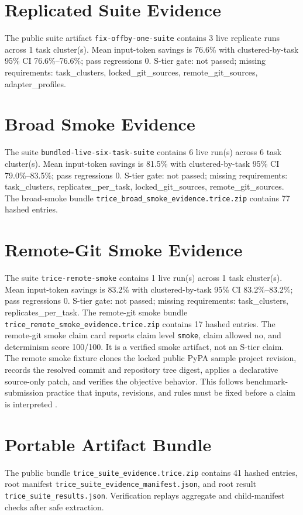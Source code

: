 \documentclass[10pt]{article}
\begin{document}
        \section{Replicated Suite Evidence}
        The public suite artifact \texttt{fix-offby-one-suite} contains 3 live replicate runs across 1 task cluster(s). Mean input-token savings is 76.6\% with clustered-by-task 95\% CI 76.6\%--76.6\%; pass regressions 0. S-tier gate: not passed; missing requirements: task\_clusters, locked\_git\_sources, remote\_git\_sources, adapter\_profiles.

        \section{Broad Smoke Evidence}
        The suite \texttt{bundled-live-six-task-suite} contains 6 live run(s) across 6 task cluster(s). Mean input-token savings is 81.5\% with clustered-by-task 95\% CI 79.0\%--83.5\%; pass regressions 0. S-tier gate: not passed; missing requirements: task\_clusters, replicates\_per\_task, locked\_git\_sources, remote\_git\_sources. The broad-smoke bundle \texttt{trice_broad_smoke_evidence.trice.zip} contains 77 hashed entries.

        \section{Remote-Git Smoke Evidence}
        The suite \texttt{trice-remote-smoke} contains 1 live run(s) across 1 task cluster(s). Mean input-token savings is 83.2\% with clustered-by-task 95\% CI 83.2\%--83.2\%; pass regressions 0. S-tier gate: not passed; missing requirements: task\_clusters, replicates\_per\_task. The remote-git smoke bundle \texttt{trice_remote_smoke_evidence.trice.zip} contains 17 hashed entries. The remote-git smoke claim card reports claim level \texttt{smoke}, claim allowed no, and determinism score 100/100. It is a verified smoke artifact, not an S-tier claim.
        The remote smoke fixture clones the locked public PyPA sample project
        revision, records the resolved commit and repository tree digest, applies
        a declarative source-only patch, and verifies the objective behavior.
        This follows benchmark-submission practice that inputs, revisions, and
        rules must be fixed before a claim is interpreted
        \cite{mlperfpolicies,pypasample}.

        \section{Portable Artifact Bundle}
        The public bundle \texttt{trice_suite_evidence.trice.zip} contains 41 hashed entries, root manifest \texttt{trice_suite_evidence_manifest.json}, and root result \texttt{trice_suite_results.json}. Verification replays aggregate and child-manifest checks after safe extraction.
\end{document}
